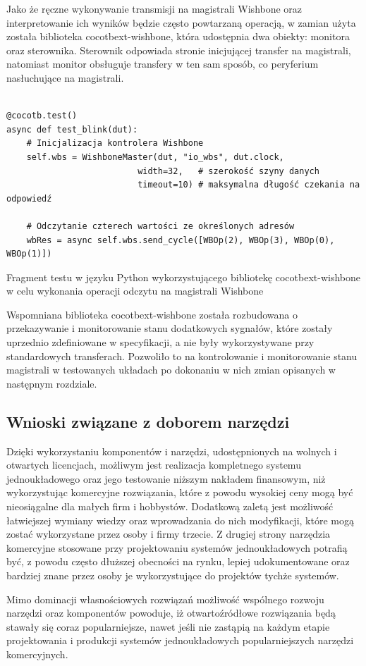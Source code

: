 Jako że ręczne wykonywanie transmisji na magistrali Wishbone oraz interpretowanie ich wyników będzie często powtarzaną operacją, w zamian użyta została biblioteka cocotbext-wishbone\cite{cocotbext-wishbone:2022:Online}, która udostępnia dwa obiekty: monitora oraz sterownika. Sterownik odpowiada stronie inicjującej transfer na magistrali, natomiast monitor obsługuje transfery w ten sam sposób, co peryferium nasłuchujące na magistrali.

\begin{listing}[H]
\begin{verbatim}

@cocotb.test()
async def test_blink(dut):
    # Inicjalizacja kontrolera Wishbone
    self.wbs = WishboneMaster(dut, "io_wbs", dut.clock,
                          width=32,   # szerokość szyny danych
                          timeout=10) # maksymalna długość czekania na odpowiedź

    # Odczytanie czterech wartości ze określonych adresów
    wbRes = async self.wbs.send_cycle([WBOp(2), WBOp(3), WBOp(0), WBOp(1)])
\end{verbatim}
\caption{\label{lst:tooling-cocotbext-wishbone-example}Fragment testu w języku Python wykorzystującego bibliotekę cocotbext-wishbone w celu wykonania operacji odczytu na magistrali Wishbone}
\end{listing}

Wspomniana biblioteka cocotbext-wishbone została rozbudowana o przekazywanie i monitorowanie stanu dodatkowych sygnałów, które zostały uprzednio zdefiniowane w specyfikacji, a nie były wykorzystywane przy standardowych transferach. Pozwoliło to na kontrolowanie i monitorowanie stanu magistrali w testowanych układach po dokonaniu w nich zmian opisanych w następnym rozdziale.

\subsection{Wnioski związane z doborem narzędzi}

Dzięki wykorzystaniu komponentów i narzędzi, udostępnionych na wolnych i otwartych licencjach, możliwym jest realizacja kompletnego systemu jednoukładowego oraz jego testowanie niższym nakładem finansowym, niż wykorzystując komercyjne rozwiązania, które z powodu wysokiej ceny mogą być nieosiągalne dla małych firm i hobbystów.
Dodatkową zaletą jest możliwość łatwiejszej wymiany wiedzy oraz wprowadzania do nich modyfikacji, które mogą zostać wykorzystane przez osoby i firmy trzecie.
Z drugiej strony narzędzia komercyjne stosowane przy projektowaniu systemów jednoukładowych potrafią być, z powodu często dłuższej obecności na rynku, lepiej udokumentowane oraz bardziej znane przez osoby je wykorzystujące do projektów tychże systemów.

Mimo dominacji własnościowych rozwiązań możliwość wspólnego rozwoju narzędzi oraz komponentów powoduje, iż otwartoźródłowe rozwiązania będą stawały się coraz popularniejsze, nawet jeśli nie zastąpią na każdym etapie projektowania i produkcji systemów jednoukładowych popularniejszych narzędzi komercyjnych.
